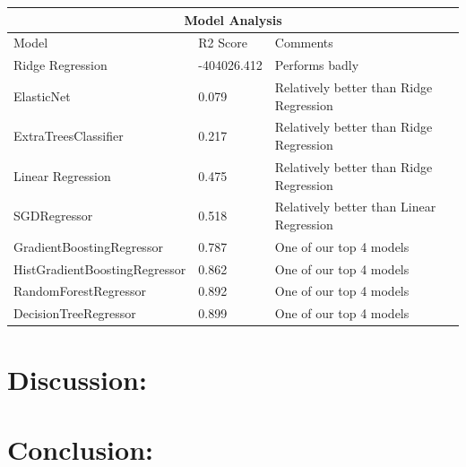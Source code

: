 \documentclass{article}
\begin{document}
\begin{tabular}{ |p{5cm}||p{3cm}||p{5cm}|  }
 \hline
 \multicolumn{3}{|c|}{Model Analysis} \\
 \hline
 \hline
Model   & R2 Score & Comments\\
 \hline
 \hline
 Ridge Regression   & -404026.412 & Performs badly  \\
   \hline
 ElasticNet  & 0.079 & Relatively better than Ridge Regression \\
  \hline
   ExtraTreesClassifier & 0.217 & Relatively better than Ridge Regression \\
 \hline
  Linear Regression   & 0.475 & Relatively better than Ridge Regression \\
  \hline
SGDRegressor   & 0.518 & Relatively better than Linear Regression \\
  \hline
  GradientBoostingRegressor & 0.787 &  One of our top 4 models \\
   \hline
  HistGradientBoostingRegressor & 0.862 &  One of our top 4 models \\
  \hline
  RandomForestRegressor & 0.892 &  One of our top 4 models \\
  \hline
   DecisionTreeRegressor & 0.899&  One of our top 4 models \\
  \hline
\end{tabular}

\section{Discussion:}
\section{Conclusion:}
\end{document}

